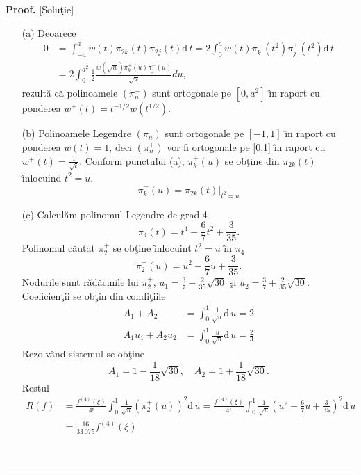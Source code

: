 \documentclass[a4paper]{article}%
\newenvironment{proof}[1][Proof]{\noindent\textbf{#1.} }{\ \rule{0.5em}{0.5em}}
\begin{document}
\begin{proof}
[Solu\c{t}ie]

\begin{enumerate}
\item[(a)] Deoarece%
\begin{align*}
0  & =\int_{-a}^{a}w(t)\pi_{2k}(t)\pi_{2j}(t)\mathrm{d}\,t=2\int_{0}%
^{a}w(t)\pi_{k}^{+}(t^{2})\pi_{j}^{+}(t^{2})\mathrm{d}\,t\\
& =2\int_{0}^{a^{2}}\frac{1}{2}\frac{w\left(  \sqrt{u}\right)  \pi_{k}%
^{+}(u)\pi_{j}^{-}\left(  u\right)  }{\sqrt{u}}du,
\end{align*}
rezult\u{a} c\u{a} polinoamele $\left(  \pi_{n}^{+}\right)  $ sunt ortogonale
pe $[0,a^{2}]$ \^{\i}n raport cu ponderea $w^{+}(t)=t^{-1/2}w(t^{1/2})$.

\item[(b)] Polinoamele Legendre $\left(  \pi_{n}\right)  $ sunt ortogonale pe
$[-1,1]$ \^{\i}n raport cu ponderea $w(t)=1$, deci $\left(  \pi_{n}%
^{+}\right)  $ vor fi ortogonale pe [0,1] \^{\i}n raport cu $w^{+}(t)=\frac
{1}{\sqrt{t}}$. Conform punctului (a), $\pi_{k}^{+}(u)$ se ob\c{t}ine din
$\pi_{2k}(t)$ \^{\i}nlocuind $t^{2}=u$.
\[
\pi_{k}^{+}(u)=\left.  \pi_{2k}(t)\right\vert _{t^{2}=u}%
\]


\item[(c)] Calcul\u{a}m polinomul Legendre de grad 4%
\[
\pi_{4}(t)=t^{4}-\frac{6}{7}t^{2}+\frac{3}{35}.
\]
Polinomul c\u{a}utat $\pi_{2}^{+}$ se ob\c{t}ine \^{\i}nlocuint $t^{2}=u$
\^{\i}n $\pi_{4}$%
\[
\pi_{2}^{+}(u)=u^{2}-\frac{6}{7}u+\frac{3}{35}.
\]
Nodurile sunt r\u{a}d\u{a}cinile lui $\pi_{2}^{+}$, $u_{1}=\frac{3}{7}%
-\frac{2}{35}\sqrt{30}$ \c{s}i $u_{2}=\frac{3}{7}+\frac{2}{35}\sqrt{30}$.
Coeficien\c{t}ii se ob\c{t}in din condi\c{t}iile%
\begin{align*}
A_{1}+A_{2}  & =\int_{0}^{1}\frac{1}{\sqrt{u}}\mathrm{d}\,u=2\\
A_{1}u_{1}+A_{2}u_{2}  & =\int_{0}^{1}\frac{u}{\sqrt{u}}\mathrm{d}\,u=\frac
{2}{3}%
\end{align*}
Rezolv\^{a}nd sistemul se ob\c{t}ine%
\[
A_{1}=1-\frac{1}{18}\sqrt{30},\quad A_{2}=1+\frac{1}{18}\sqrt{30}.
\]
Restul%
\begin{align*}
R(f)  & =\frac{f^{(4)}(\xi)}{4!}\int_{0}^{1}\frac{1}{\sqrt{u}}\left(  \pi
_{2}^{+}(u)\right)  ^{2}\mathrm{d}\,u=\frac{f^{(4)}(\xi)}{4!}\int_{0}^{1}%
\frac{1}{\sqrt{u}}\left(  u^{2}-\frac{6}{7}u+\frac{3}{35}\right)
^{2}\mathrm{d}\,u\\
& =\frac{16}{33\,075}f^{(4)}(\xi)
\end{align*}

\end{enumerate}
\end{proof}
\end{document}
